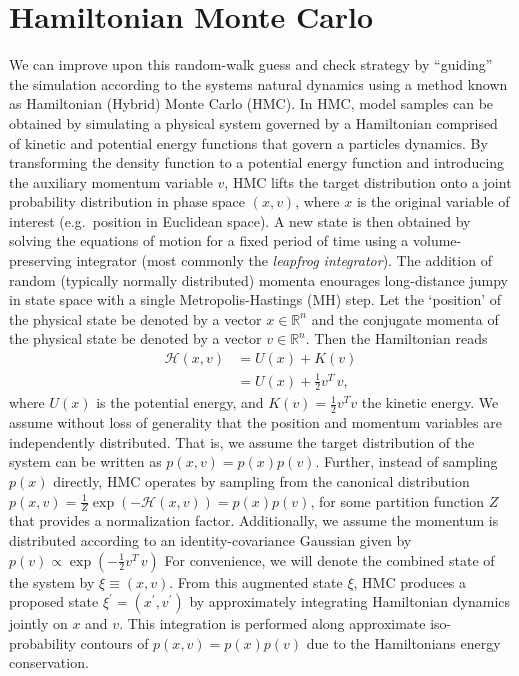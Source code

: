 \documentclass[../main.tex]{subfiles}
\begin{document}
\section{Hamiltonian Monte Carlo}%
\label{sec:l2hmc_hmc}
We can improve upon this random-walk guess and check strategy by ``guiding'' the simulation according to the systems
natural dynamics using a method known as Hamiltonian (Hybrid) Monte Carlo (HMC).
%
In HMC, model samples can be obtained by simulating a physical system governed by a Hamiltonian comprised of kinetic
and potential energy functions that govern a particles dynamics.
%
By transforming the density function to a potential energy function and introducing the auxiliary momentum variable
$v$, HMC lifts the target distribution onto a joint probability distribution in phase space $(x, v)$, where $x$ is the
original variable of interest (e.g.\ position in Euclidean space).
%
A new state is then obtained by solving the equations of motion for a fixed period of time using a volume-preserving
integrator (most commonly the \emph{leapfrog integrator}).
%
The addition of random (typically normally distributed) momenta enourages long-distance jumpy in state space with a
single Metropolis-Hastings (MH) step.
%
Let the `position' of the physical state be denoted by a vector $x \in\mathbb{R}^{n}$ and the conjugate momenta of the
physical state be denoted by a vector $v \in\mathbb{R}^{n}$.  Then the Hamiltonian reads
%
\begin{align}
    \mathcal{H}(x, v) &= U(x) + K(v)\\
                      & = U(x) + \frac{1}{2} v^{T} \,v,
    \label{eq:hamiltonian}
\end{align}
%
where $U(x)$ is the potential energy, and $K(v)=\frac{1}{2}v^{T}v$ the kinetic energy.
%
We assume without loss of generality that the position and momentum variables are independently distributed.
%
That is, we assume the target distribution of the system can be written as $p(x, v) = p(x) p(v)$.
%
Further, instead of sampling $p(x)$ directly, HMC operates by sampling from the canonical distribution $p(x, v) =
\frac{1}{Z} \exp(-\mathcal{H}(x, v)) = p(x) p(v)$, for some partition function $Z$ that provides a normalization
factor.
%
Additionally, we assume the momentum is distributed according to an identity-covariance Gaussian given by $p(v) \propto
\exp{(-\frac{1}{2} v^{T} \, v)}$ For convenience, we will denote the combined state of the system by $\xi \equiv (x,
v)$.
%
From this augmented state $\xi$, HMC produces a proposed state $\xi^{\prime} = (x^{\prime}, v^{\prime})$ by
approximately integrating Hamiltonian dynamics jointly on $x$ and $v$.
%
This integration is performed along approximate iso-probability contours of $p(x, v) = p(x) p(v)$ due to the
Hamiltonians energy conservation.
%
\end{document}
